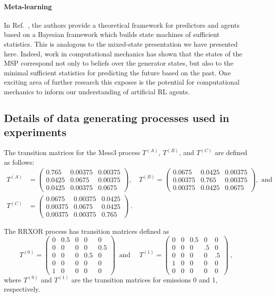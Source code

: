 \documentclass{article}
\begin{document}
\paragraph{Meta-learning}
In Ref.~\cite{ortega2019meta}, the authors provide a theoretical framework for predictors and agents based on a Bayesian framework which builds state machines of sufficient statistics. This is analogous to the mixed-state presentation we have presented here. Indeed, work in computational mechanics has shown that the states of the MSP correspond not only to beliefs over the generator states, but also to the minimal sufficient statistics for predicting the future based on the past. One exciting area of further research this exposes is the potential for computational mechanics to inform our understanding of artificial RL agents.


\subsection{Details of data generating processes used in experiments}
The transition matrices for the Mess3 process \(T^{(A)}\), \(T^{(B)}\), and \(T^{(C)}\) are defined as follows:
\begin{align*}
T^{(A)} &= 
\begin{pmatrix}
0.765 & 0.00375 & 0.00375 \\
0.0425 & 0.0675 & 0.00375 \\
0.0425 & 0.00375 & 0.0675
\end{pmatrix},
\quad
T^{(B)} = 
\begin{pmatrix}
0.0675 & 0.0425 & 0.00375 \\
0.00375 & 0.765 & 0.00375 \\
0.00375 & 0.0425 & 0.0675
\end{pmatrix}, \text{ and}\\
T^{(C)} &= 
\begin{pmatrix}
0.0675 & 0.00375 & 0.0425 \\
0.00375 & 0.0675 & 0.0425 \\
0.00375 & 0.00375 & 0.765
\end{pmatrix} ~.
\end{align*}

The RRXOR process has transition matrices defined as 
\[
T^{(0)} = 
\begin{pmatrix}
0 & 0.5 & 0 & 0 & 0 \\
0 & 0 & 0 & 0 & 0.5 \\
0 & 0 & 0 & 0.5 & 0 \\
0 & 0 & 0 & 0 & 0 \\
1 & 0 & 0 & 0 & 0
\end{pmatrix} ~ \text{ and }
\quad
T^{(1)} = 
\begin{pmatrix}
0 & 0 &  0.5 & 0 & 0 \\
0 & 0 & 0 & .5 & 0 \\
0 & 0 & 0 & 0 & .5 \\
1 & 0 & 0 & 0 & 0 \\
0 & 0 & 0 & 0 & 0
\end{pmatrix} ~,
\]
where \( T^{(0)} \) and \( T^{(1)} \) are the transition matrices for emissions 0 and 1, respectively.
\end{document}

